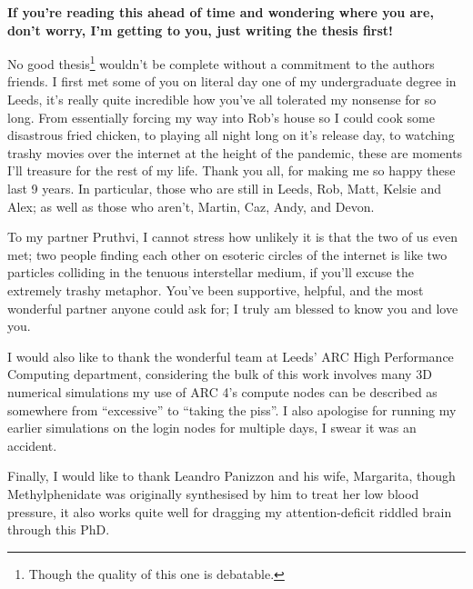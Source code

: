 

\begin{acknowledgements}      %

\setlength{\parindent}{17.62482pt}
\setlength{\parskip}{0.0pt plus 1.0pt}

\textbf{If you're reading this ahead of time and wondering where you are, don't worry, I'm getting to you, just writing the thesis first!}

No good thesis\footnote{Though the quality of this one is debatable.} wouldn't be complete without a commitment to the authors friends.
I first met some of you on literal day one of my undergraduate degree in Leeds, it's really quite incredible how you've all tolerated my nonsense for so long.
From essentially forcing my way into Rob's house so I could cook some disastrous fried chicken, to playing  all night long on it's release day, to watching trashy movies over the internet at the height of the pandemic, these are moments I'll treasure for the rest of my life.
Thank you all, for making me so happy these last 9 years.
In particular, those who are still in Leeds, Rob, Matt, Kelsie and Alex; as well as those who aren't, Martin, Caz, Andy, and Devon. 

To my partner Pruthvi, I cannot stress how unlikely it is that the two of us even met; two people finding each other on esoteric circles of the internet is like two particles colliding in the tenuous interstellar medium, if you'll excuse the extremely trashy metaphor.
You've been supportive, helpful, and the most wonderful partner anyone could ask for; I truly am blessed to know you and love you.

I would also like to thank the wonderful team at Leeds' ARC High Performance Computing department, considering the bulk of this work involves many 3D numerical simulations my use of ARC 4's compute nodes can be described as somewhere from ``excessive'' to ``taking the piss''.
I also apologise for running my earlier simulations on the login nodes for multiple days, I swear it was an accident.

Finally, I would like to thank Leandro Panizzon and his wife, Margarita, though Methylphenidate was originally synthesised by him to treat her low blood pressure, it also works quite well for dragging my attention-deficit riddled brain through this PhD.

\end{acknowledgements}



